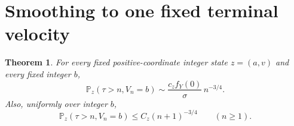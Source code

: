 \documentclass[11pt,letterpaper]{article}
\newtheorem{theorem}{Theorem}[section]
\theoremstyle{definition}\newtheorem{remark}[theorem]{Remark}
\newcommand{\Pp}{\mathbb P}\newcommand{\Ee}{\mathbb E}
\newcommand{\fY}{f_Y}\newcommand{\code}[1]{\texttt{#1}}
\begin{document}
\section{Smoothing to one fixed terminal velocity}\label{sct:sec:smoothing}
\begin{theorem}\label{sct:thm:endpoint}
For every fixed positive-coordinate integer state $z=(a,v)$ and every fixed
integer $b$,
\begin{equation}\label{sct:eq:endpoint}
 \Pp_z(\tau>n,V_n=b)\sim\frac{c_z\fY(0)}{\sigma}\,n^{-3/4}.
\end{equation}
Also, uniformly over integer $b$,
\begin{equation}\label{sct:eq:uniform-endpoint}
 \Pp_z(\tau>n,V_n=b)\le C_z(n+1)^{-3/4}\qquad(n\ge1).
\end{equation}
\end{theorem}
\end{document}
